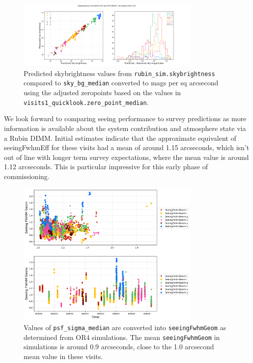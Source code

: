 \begin{figure}
    \centering
    \includegraphics[width=0.8\textwidth]{sp/sky.png}
    \caption{Predicted skybrightness values from \texttt{rubin\_sim.skybrightness} compared to
      \texttt{sky\_bg\_median} converted to mags per sq arcsecond  using the adjusted zeropoints based on the values in  \texttt{visits1\_quicklook.zero\_point\_median}.}
    \label{fig:sky}
    \end{figure}


We look forward to comparing seeing performance to survey predictions as more information is available about the system contribution and atmosphere state via a Rubin DIMM. Initial estimates indicate that the approximate equivalent of seeingFwhmEff for these visits had a mean of around 1.15 arcseconds, which isn't out of line with longer term survey expectations, where the mean value is around 1.12 arcseconds. This is particular impressive for this early phase of commissioning. 

\begin{figure}
    \centering
    \includegraphics[width=0.8\textwidth]{sp/seeing.png}
    \caption{Values of \texttt{psf\_sigma\_median} are converted into \texttt{seeingFwhmGeom} as determined from OR4 simulations. The mean \texttt{seeingFwhmGeom} in simulations is around 0.9 arcseconds, close to the 1.0 arcsecond mean value in these visits.}
    \label{fig:seeing}
    \end{figure}


